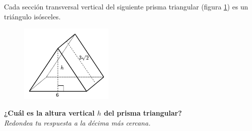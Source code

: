 Cada sección transversal vertical del siguiente prisma triangular (figura \ref{fig:pitagoras3D_pris_03}) es un triángulo isósceles.
\begin{figure}[H]
    \begin{center}
        \includegraphics[width=0.4\textwidth]{../images/pitagoras3D_pris_03.png}
    \end{center}
    \caption{}
    \label{fig:pitagoras3D_pris_03}
\end{figure}
\textbf{¿Cuál es la altura vertical $h$ del prisma triangular?}\\
\textit{Redondea tu respuesta a la décima más cercana.}